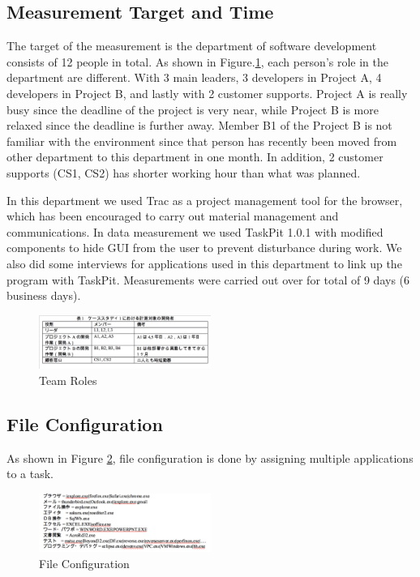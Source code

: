 \documentclass [paper]{ieice}
\begin{document}
\subsection{Measurement Target and Time}
	The target of the measurement is the department of software development consists of 12 people in total. As shown in Figure.\ref{fig7}, each person's role in the department are different. With 3 main leaders, 3 developers in Project A, 4 developers in Project B, and lastly with 2 customer supports. Project A is really busy since the deadline of the project is very near, while Project B is more relaxed since the deadline is further away. Member B1 of the Project B is not familiar with the environment since that person has recently been moved from other department to this department in one month. In addition, 2 customer supports (CS1, CS2) has shorter working hour than what was planned. \par
	In this department we used Trac as a project management tool for the browser, which has been encouraged to carry out material management and communications. In data measurement we used TaskPit 1.0.1 with modified components to hide GUI from the user to prevent disturbance during work. We also did some interviews for applications used in this department to link up the program with TaskPit. Measurements were carried out over for total of 9 days (6 business days).

\begin{figure}[h]
	\centering	
\includegraphics[width=0.5\textwidth]{fig7}
	\caption{Team Roles}
	\label{fig7}
\end{figure}

\subsection{File Configuration}
	As shown in Figure \ref{fig8}, file configuration is done by assigning multiple applications to a task.
	
\begin{figure}[h]
	\centering	
\includegraphics[width=0.5\textwidth]{fig8}
	\caption{File Configuration}
	\label{fig8}
\end{figure}
\end{document}
